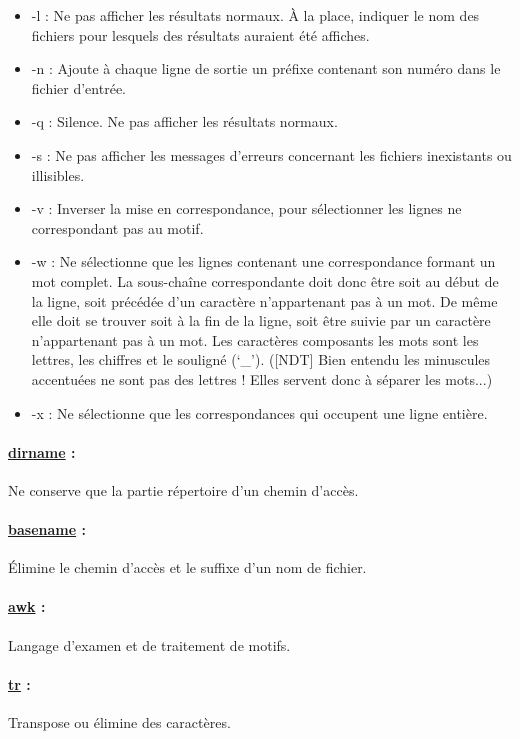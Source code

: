 \documentclass{article}[12pt]
\begin{document}
\begin{itemize}
\item -l : Ne pas afficher les résultats normaux. À la place, indiquer le nom des fichiers pour lesquels des résultats auraient été affiches.
\item -n : Ajoute à chaque ligne de sortie un préfixe contenant son numéro dans le fichier d'entrée.
\item -q : Silence. Ne pas afficher les résultats normaux.
\item -s : Ne pas afficher les messages d'erreurs concernant les fichiers inexistants ou illisibles.
\item -v : Inverser la mise en correspondance, pour sélectionner les lignes ne correspondant pas au motif.
\item -w : Ne sélectionne que les lignes contenant une correspondance formant un mot complet. La sous-chaîne correspondante doit donc être soit au début de la ligne, soit précédée d'un caractère n'appartenant pas à un mot. De même elle doit se trouver soit à la fin de la ligne, soit être suivie par un caractère n'appartenant pas à un mot. Les caractères composants les mots sont les lettres, les chiffres et le souligné (`\_'). ([NDT] Bien entendu les minuscules accentuées ne sont pas des lettres ! Elles servent donc à séparer les mots...)
\item -x : Ne sélectionne que les correspondances qui occupent une ligne entière.
\end{itemize}
\paragraph{\href{http://jp.barralis.com/linux-man/man1/dirname.1.php}{dirname} : } Ne conserve que la partie répertoire d'un chemin d'accès.
\paragraph{\href{http://jp.barralis.com/linux-man/man1/basename.1.php}{basename} : } Élimine le chemin d'accès et le suffixe d'un nom de fichier.
\paragraph{\href{http://jp.barralis.com/linux-man/man1/gawk.1.php}{awk} : } Langage d'examen et de traitement de motifs.  
\paragraph{\href{http://jp.barralis.com/linux-man/man1/tr.1.php}{tr} : } Transpose ou élimine des caractères.
\end{document}

